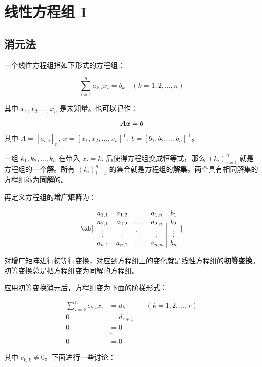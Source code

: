 \section{线性方程组 I}

\subsection{消元法}

一个线性方程组指如下形式的方程组：

$$
\sum_{i=1}^n a_{k,i} x_i = b_k \quad (k=1,2,\dots,n)
$$

其中 $x_1,x_2,\dots,x_n$ 是未知量。也可以记作：

$$
\boldsymbol{A} \boldsymbol{x} = \boldsymbol{b}
$$

其中 $A = [a_{i,j}]_n,\ x = [x_1,x_2,\dots,x_n]^\mathrm{T},\ b = [b_1,b_2,\dots,b_n]^\mathrm{T}$。

一组 $k_1,k_2,\dots,k_n$ 在带入 $x_i = k_i$ 后使得方程组变成恒等式，那么 $(k_i)_{i=1}^n$ 就是方程组的一个\textbf{解}。所有 $(k_i)_{i=1}^n$ 的集合就是方程组的\textbf{解集}。两个具有相同解集的方程组称为\textbf{同解}的。

再定义方程组的\textbf{增广矩阵}为：

$$
\ab[\begin{array}{cccc|c}
	a_{1,1} & a_{1,2} & \dots & a_{1,n} & b_1 \\
	a_{2,1} & a_{2,2} & \dots & a_{2,n} & b_2 \\
	\vdots & \vdots & \ddots & \vdots & \vdots \\
	a_{n,1} & a_{n,2} & \dots & a_{n,n} & b_n
\end{array}]
$$

\begin{definition}[线性方程组的初等变换]
	对增广矩阵进行初等行变换，对应到方程组上的变化就是线性方程组的\textbf{初等变换}。初等变换总是把方程组变为同解的方程组。
\end{definition}

应用初等变换消元后，方程组变为下面的阶梯形式：

$$
\begin{aligned}
	\sum_{i=k}^n c_{k,i} x_i & = d_k & \quad (k=1,2,\dots,r) \\
	0 & = d_{r+1} \\
	0 & = 0 \\
	& \cdots \\
	0 & = 0
\end{aligned}
$$

其中 $c_{k,k} \neq 0$。下面进行一些讨论：

